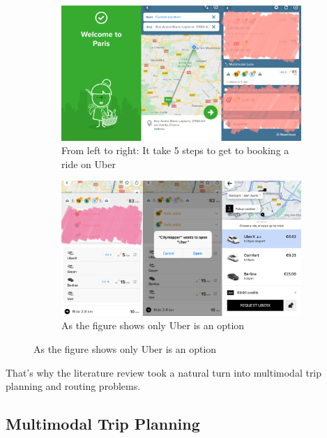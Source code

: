 \documentclass{article}
\begin{document}
\begin{figure}[H]
\label{fig:citymapper_exp}
    \centering 
\begin{subfigure}{\textwidth}
  \includegraphics[width=\linewidth]{pictures/citymapper_experiment/Citymapper_experiment_1}
  \caption{From left to right: It take 5 steps to get to booking a ride on Uber}
\end{subfigure}
\medskip
\begin{subfigure}{\textwidth}
  \includegraphics[width=\linewidth]{pictures/citymapper_experiment/Citymapper_experiment_2}
  \caption{As the figure shows only Uber is an option}
\end{subfigure}
\end{figure}

That\rq{s} why the literature review took a natural turn into multimodal trip planning and routing problems.


\subsection{Multimodal Trip Planning}
\label{subsec:Intermodal}
\end{document}
